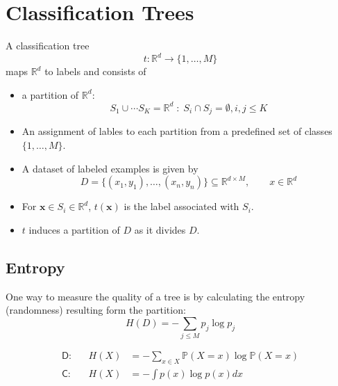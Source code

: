 \section{Classification Trees}
A classification tree
\noindent\begin{equation*}
    t: \mathbb{R}^d \to \{1,\ldots, M\}
\end{equation*}
maps $\mathbb{R}^d$ to labels and consists of
\begin{itemize}
    \item a partition of $\mathbb{R}^d$:
          \noindent\begin{equation*}
              S_1\cup \cdots S_K = \mathbb{R}^d \;:\; S_i\cap S_j=\emptyset , i,j\leq K
          \end{equation*}
    \item An assignment of lables to each partition from a predefined set of classes $\{1,\ldots, M\}$.
    \item A dataset of labeled examples is given by
          \noindent\begin{equation*}
              D=\{(x_{1},y_{1}),\ldots,(x_{n},y_{n})\}\subseteq\mathbb{R}^{d\times M},\qquad x\in \mathbb{R}^d
          \end{equation*}
\end{itemize}


\begin{itemize}
    \item For $\mathbf{x}\in S_i\in\mathbb{R}^d$, $t(\mathbf{x})$ is the label associated with $S_i$.
    \item $t$ induces a partition of $D$ as it divides $D$.
\end{itemize}


\subsection{Entropy}
One way to measure the quality of a tree is by calculating the entropy (randomness) resulting form the partition:
\noindent\begin{equation*}
    H(D)=-\sum_{j\leq M}p_j\log p_j
\end{equation*}

\noindent\begin{align*}
    \mathsf{D}: && H(X)&=-\sum_{x\in X}\mathbb{P}(X=x)\log\mathbb{P}(X=x)\\
    \mathsf{C}: && H(X)&=-\int p(x)\log p(x) dx
\end{align*}


